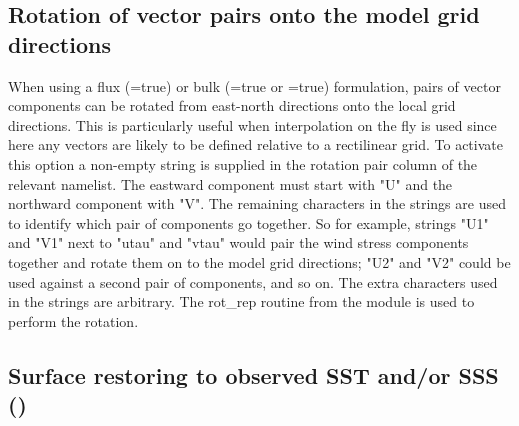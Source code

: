 \documentclass[NEMO_book]{subfiles}
\begin{document}
\subsection{Rotation of vector pairs onto the model grid directions}
\label{SBC_rotation}

When using a flux (=true) or bulk (=true or =true) formulation, 
pairs of vector components can be rotated from east-north directions onto the local grid directions.  
This is particularly useful when interpolation on the fly is used since here any vectors are likely to be defined 
relative to a rectilinear grid.
To activate this option a non-empty string is supplied in the rotation pair column of the relevant namelist.
The eastward component must start with "U" and the northward component with "V".  
The remaining characters in the strings are used to identify which pair of components go together.
So for example, strings "U1" and "V1" next to "utau" and "vtau" would pair the wind stress components together
and rotate them on to the model grid directions; "U2" and "V2" could be used against a second pair of components, 
and so on.
The extra characters used in the strings are arbitrary.
The rot\_rep routine from the  module is used to perform the rotation.

\subsection    [Surface restoring to observed SST and/or SSS (\textit{sbcssr})]
			{Surface restoring to observed SST and/or SSS ()}
\label{SBC_ssr}
\end{document}
